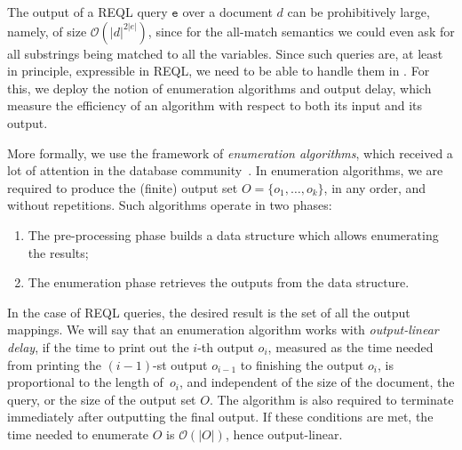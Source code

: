 
The output of a REQL query $\texttt{e}$ over a document $d$ can be prohibitively large, namely, of size $\mathcal{O}(|d|^{2|e|})$, since for the all-match semantics we could even ask for all substrings being matched to all the variables. Since such queries are, at least in principle, expressible in REQL, we need to be able to handle them in \rematch. For this, we deploy the notion of enumeration algorithms and output delay, which measure the efficiency of an algorithm  %
with respect to both its input and its output.

More formally, we use the framework of \emph{enumeration algorithms}, which received a lot of attention in the database community~\cite{AmarilliBMN-tods21,FlorenzanoRUVV20,LosemannM-lics14,SchweikardtSV-jacm22,BerkholzGS-siglog20,Segoufin13,IdrisUVVL-vldbj20,IdrisUV-sigmod17,TziavelisAGRY-pvldb20}. In enumeration algorithms, we are required to produce the (finite) output set $O = \{o_1,\ldots ,o_k\}$, in any order, and without repetitions. Such algorithms operate in two phases:
\begin{enumerate}
	\item The pre-processing phase builds a data structure which allows enumerating the results;
	\item The enumeration phase retrieves the outputs from the data structure.%
\end{enumerate}
In the case of REQL queries, the desired result is the set of all the output mappings. We will say that an enumeration algorithm works with \emph{output-linear delay}, if the time to print out the $i$-th output $o_i$, measured as the time needed from printing the $(i-1)$-st output $o_{i-1}$ to finishing the output $o_i$, is proportional to the length of~$o_i$, and independent of the size of the document, the query, or the size of the output set $O$. The algorithm is also required to terminate immediately after outputting the final output. If these conditions are met, the time needed to enumerate $O$ is $\mathcal{O}(|O|)$, hence output-linear. 


